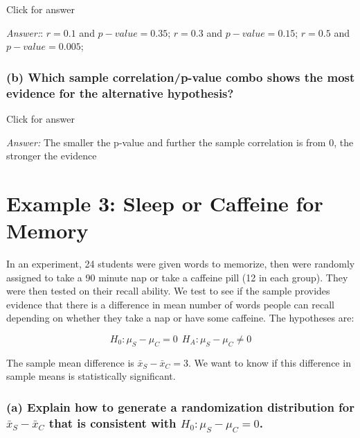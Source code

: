 \documentclass[
]{book}
\begin{document}
Click for answer

\emph{Answer:}: \(r=0.1\) and \(p-value=0.35\); \(r=0.3\) and \(p-value=0.15\); \(r=0.5\) and \(p-value=0.005\);

\hypertarget{b-which-sample-correlationp-value-combo-shows-the-most-evidence-for-the-alternative-hypothesis}{%
\subsubsection{(b) Which sample correlation/p-value combo shows the most evidence for the alternative hypothesis?}\label{b-which-sample-correlationp-value-combo-shows-the-most-evidence-for-the-alternative-hypothesis}}

Click for answer

\emph{Answer:} The smaller the p-value and further the sample correlation is from 0, the stronger the evidence

\hypertarget{example-3-sleep-or-caffeine-for-memory}{%
\section{Example 3: Sleep or Caffeine for Memory}\label{example-3-sleep-or-caffeine-for-memory}}

In an experiment, 24 students were given words to memorize, then were randomly assigned to take a 90 minute nap or take a caffeine pill (12 in each group). They were then tested on their recall ability. We test to see if the sample provides evidence that there is a difference in mean number of words people can recall depending on whether they take a nap or have some caffeine. The hypotheses are:

\[
H_0: \mu_S - \mu_C = 0 \ \ H_A: \mu_S - \mu_C \neq 0
\]

The sample mean difference is \(\bar{x}_S - \bar{x}_C = 3\). We want to know if this difference in sample means is statistically significant.

\hypertarget{a-explain-how-to-generate-a-randomization-distribution-for-barx_s---barx_c-that-is-consistent-with-h_0-mu_s---mu_c-0.}{%
\subsubsection{\texorpdfstring{(a) Explain how to generate a randomization distribution for \(\bar{x}_S - \bar{x}_C\) that is consistent with \(H_0: \mu_S - \mu_C = 0\).}{(a) Explain how to generate a randomization distribution for \textbackslash bar\{x\}\_S - \textbackslash bar\{x\}\_C that is consistent with H\_0: \textbackslash mu\_S - \textbackslash mu\_C = 0.}}\label{a-explain-how-to-generate-a-randomization-distribution-for-barx_s---barx_c-that-is-consistent-with-h_0-mu_s---mu_c-0.}}
\end{document}
